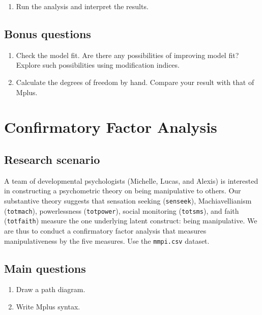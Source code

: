 \documentclass[
]{book}
\providecommand{\tightlist}{%
  \setlength{\itemsep}{0pt}\setlength{\parskip}{0pt}}
\begin{document}
\begin{enumerate}
\def\labelenumi{\arabic{enumi}.}
\setcounter{enumi}{2}
\tightlist
\item
  Run the analysis and interpret the results.
\end{enumerate}

\section{Bonus questions}\label{bonus-questions}

\begin{enumerate}
\def\labelenumi{\arabic{enumi}.}
\item
  Check the model fit. Are there any possibilities of improving model fit? Explore such possibilities using modification indices.
\item
  Calculate the degrees of freedom by hand. Compare your result with that of Mplus.
\end{enumerate}

\chapter{Confirmatory Factor Analysis}\label{confirmatory-factor-analysis}

\section{Research scenario}\label{research-scenario-1}

A team of developmental psychologists (Michelle, Lucas, and Alexis) is interested in constructing a psychometric theory on being manipulative to others. Our substantive theory suggests that sensation seeking (\texttt{senseek}), Machiavellianism (\texttt{totmach}), powerlessness (\texttt{totpower}), social monitoring (\texttt{totsms}), and faith (\texttt{totfaith}) measure the one underlying latent construct: being manipulative. We are thus to conduct a confirmatory factor analysis that measures manipulativeness by the five measures. Use the \texttt{mmpi.csv} dataset.

\section{Main questions}\label{main-questions-1}

\begin{enumerate}
\def\labelenumi{\arabic{enumi}.}
\item
  Draw a path diagram.
\item
  Write Mplus syntax.
\end{enumerate}
\end{document}
